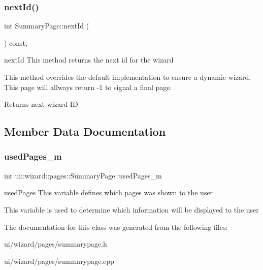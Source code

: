 \subsubsection{\texorpdfstring{next\+Id()}{nextId()}}
{\footnotesize\ttfamily int Summary\+Page\+::next\+Id (\begin{DoxyParamCaption}{ }\end{DoxyParamCaption}) const\hspace{0.3cm}{\ttfamily [override]}, {\ttfamily [protected]}}



next\+Id This method returns the next id for the wizard 

This method overrides the default implementation to ensure a dynamic wizard. This page will allways return -\/1 to signal a final page. \begin{DoxyReturn}{Returns}
next wizard ID 
\end{DoxyReturn}


\subsection{Member Data Documentation}
\mbox{\label{classui_1_1wizard_1_1pages_1_1_summary_page_a8e0bd026c5d978fbb1bf157439867fd5}} 
\subsubsection{\texorpdfstring{used\+Pages\+\_\+m}{usedPages\_m}}
{\footnotesize\ttfamily int ui\+::wizard\+::pages\+::\+Summary\+Page\+::used\+Pages\+\_\+m\hspace{0.3cm}{\ttfamily [private]}}



used\+Pages This variable defines which pages was shown to the user 

This variable is used to determine which information will be displayed to the user 

The documentation for this class was generated from the following files\+:\begin{DoxyCompactItemize}
\item 
ui/wizard/pages/summarypage.\+h\item 
ui/wizard/pages/summarypage.\+cpp\end{DoxyCompactItemize}
